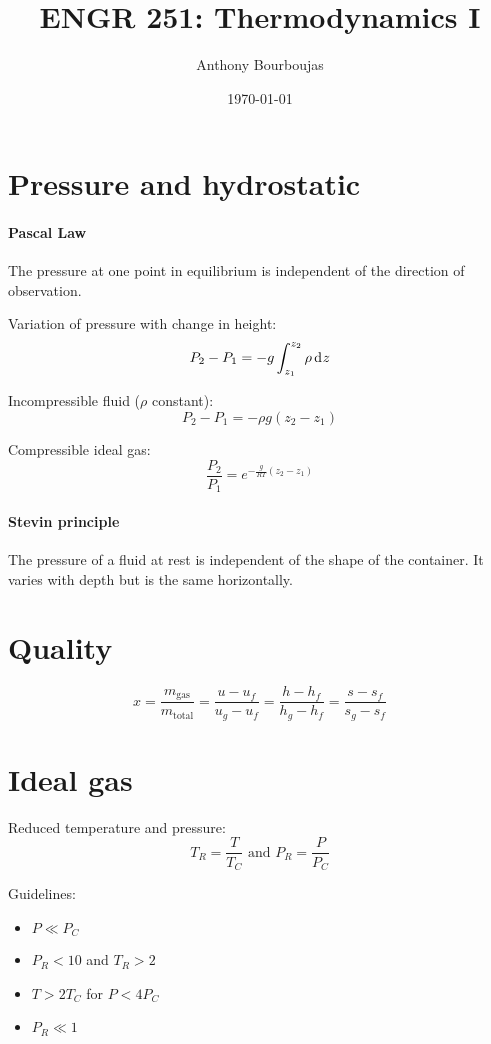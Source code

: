 \documentclass[10pt, twocolumn]{article}
\title{ENGR 251: Thermodynamics I}
\date{\today}
\author{Anthony Bourboujas}
\begin{document}
\maketitle %

\setlength{\abovedisplayskip}{2pt} %
\setlength{\belowdisplayskip}{2pt} %

\section{Pressure and hydrostatic}
\paragraph{Pascal Law}
The pressure at one point in equilibrium is independent of the direction of observation.

Variation of pressure with change in height:
\[
  P_2 - P_1 = -g\int_{z_1 }^{z_2 }{\rho\,\mathrm{d}^{} z}
\]

Incompressible fluid (\(\rho\) constant):
\[
  P_2 - P_1 = -\rho g\left( z_2 - z_1 \right)
\]

Compressible ideal gas:
\[
  \frac{P_2 }{P_1 } = e^{- \frac{g}{RT}\left( z_2 - z_1 \right)}
\]

\paragraph{Stevin principle}
The pressure of a fluid at rest is independent of the shape of the container.
It varies with depth but is the same horizontally.

\section{Quality}
\[
  x = \frac{m_{\mathrm{gas}}}{m_{\mathrm{total}}} = \frac{u - u_f }{u_g - u_f } = \frac{h - h_f }{h_g - h_f } = \frac{s - s_f }{s_g - s_f }
\]

\section{Ideal gas}
Reduced temperature and pressure:
\[
  T_R = \frac{T}{T_C } \text{ and } P_R = \frac{P}{P_C }
\]

Guidelines:
\begin{itemize}
  \item \(P \ll P_C \)
  \item \(P_R < 10\) and \(T_R > 2\)
  \item \(T > 2T_C \) for \(P < 4P_C \)
  \item \(P_R \ll 1\)
\end{itemize}
\end{document}
